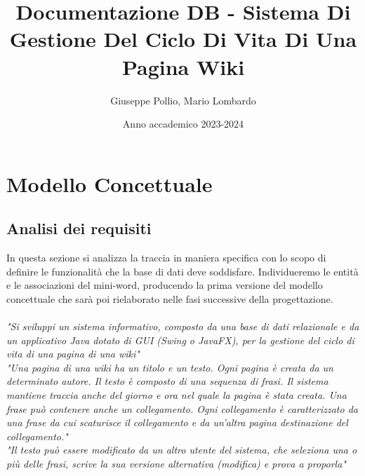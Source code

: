 \documentclass{article}
\title{Documentazione DB - Sistema Di Gestione Del Ciclo Di Vita Di Una Pagina Wiki}
\author{Giuseppe Pollio, Mario Lombardo}
\date{Anno accademico 2023-2024}
\begin{document}
	
	\maketitle
	
	\newpage
	
	\tableofcontents
	
	\newpage
	
	\section{Modello Concettuale}
	\subsection{Analisi dei requisiti}
	In questa sezione si analizza la traccia in maniera specifica con lo scopo di definire le funzionalità
	che la base di dati deve soddisfare. Individueremo le entità e le associazioni
	del mini-word, producendo la prima versione del modello concettuale che
	sarà poi rielaborato nelle fasi successive della progettazione.\\ \\
	{\itshape "Si sviluppi un sistema informativo, composto da una base di dati relazionale e da un applicativo Java dotato
		di GUI (Swing o JavaFX), per la gestione del ciclo di vita di una pagina di una wiki"}
	\vspace{0.5cm}
	\\
	{\itshape "Una pagina di una wiki ha un titolo e un testo. Ogni pagina è creata da un determinato autore. Il testo è
	composto di una sequenza di frasi. Il sistema mantiene traccia anche del giorno e ora nel quale la pagina è
	stata creata. Una frase può contenere anche un collegamento. Ogni collegamento è caratterizzato da una
	frase da cui scaturisce il collegamento e da un’altra pagina destinazione del collegamento."}
	\vspace{0.5cm}
	\\
	{\itshape "Il testo può essere modificato da un altro utente del sistema, che seleziona una o più delle frasi, scrive la sua	
	versione alternativa (modifica) e prova a proporla"}
	\vspace{0.5cm}
	
\end{document}
